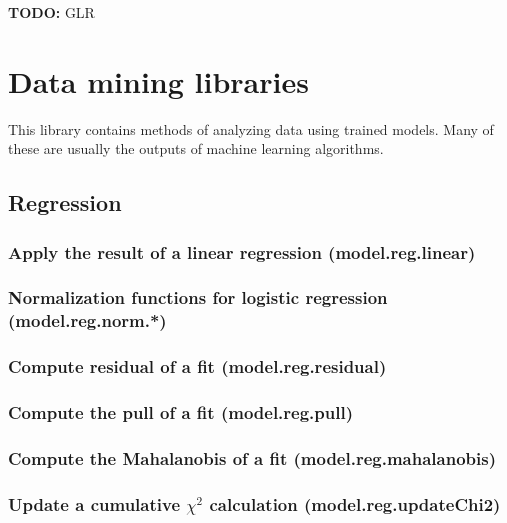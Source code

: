 \documentclass{article}
\theoremstyle{definition}
\begin{document}
{\bf TODO:} GLR

\pagebreak

\section{Data mining libraries}

This library contains methods of analyzing data using trained models.  Many of these are usually the outputs of machine learning algorithms.

\subsection{Regression}

\subsubsection{Apply the result of a linear regression (model.reg.linear)}

\subsubsection{Normalization functions for logistic regression (model.reg.norm.*)}

\subsubsection{Compute residual of a fit (model.reg.residual)}

\subsubsection{Compute the pull of a fit (model.reg.pull)}

\subsubsection{Compute the Mahalanobis of a fit (model.reg.mahalanobis)}

\subsubsection{Update a cumulative $\chi^2$ calculation (model.reg.updateChi2)}
\end{document}
